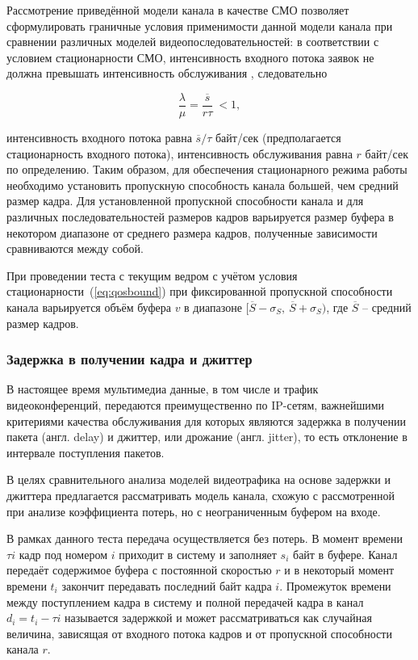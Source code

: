 Рассмотрение приведённой модели канала в качестве СМО позволяет
сформулировать граничные условия применимости данной модели
канала при сравнении различных моделей видеопоследовательностей:
в соответствии с условием стационарности СМО, интенсивность
входного потока заявок не должна превышать интенсивность обслуживания
\cite{bertsekas},
следовательно

\begin{equation}
    \frac{\lambda}{\mu} = \frac{\overline{s}}{r\tau} \ < 1,
    \label{eq:qosbound}
\end{equation}

интенсивность входного потока равна $\overline{s}/\tau$ байт/сек
(предполагается стационарность входного потока),
интенсивность обслуживания равна $r$ байт/сек по определению.
Таким образом, для обеспечения стационарного режима работы необходимо
установить пропускную способность канала большей, чем средний размер
кадра. Для установленной пропускной способности канала и для различных
последовательностей размеров кадров варьируется размер буфера в некотором
диапазоне от среднего размера кадров, полученные зависимости
сравниваются между собой.

При проведении теста с текущим ведром с учётом условия стационарности~(\ref{eq:qosbound})
при фиксированной пропускной способности канала варьируется
объём буфера $v$ в диапазоне $[\overline{S} - \sigma_S,~\overline{S} + \sigma_S)$,
где $\overline{S}$ -- средний размер кадров.

\subsubsection{Задержка в получении кадра и джиттер}
\label{sse:dejitter}
\hspace{3pt}

В настоящее время мультимедиа данные, в том числе и трафик видеоконференций,
передаются преимущественно по IP-сетям, важнейшими критериями качества обслуживания
для которых
являются задержка в получении пакета (англ. delay) и джиттер, или дрожание
(англ. jitter), то есть отклонение в интервале поступления пакетов.

В целях сравнительного анализа моделей видеотрафика на основе задержки
и джиттера предлагается рассматривать модель канала, схожую с рассмотренной
при анализе коэффициента потерь, но с неограниченным буфером на входе.

В рамках данного теста передача осуществляется без потерь. В момент времени
$\tau i$ кадр под номером $i$ приходит в систему и заполняет $s_i$
байт в буфере. Канал передаёт содержимое буфера с постоянной скоростью
$r$ и в некоторый момент времени $t_i$ закончит передавать последний
байт кадра $i$. Промежуток времени между поступлением кадра в систему и полной
передачей кадра в канал $d_i = t_i - \tau i$ называется задержкой
и может рассматриваться как случайная величина, зависящая от
входного потока кадров и от пропускной способности канала $r$.

